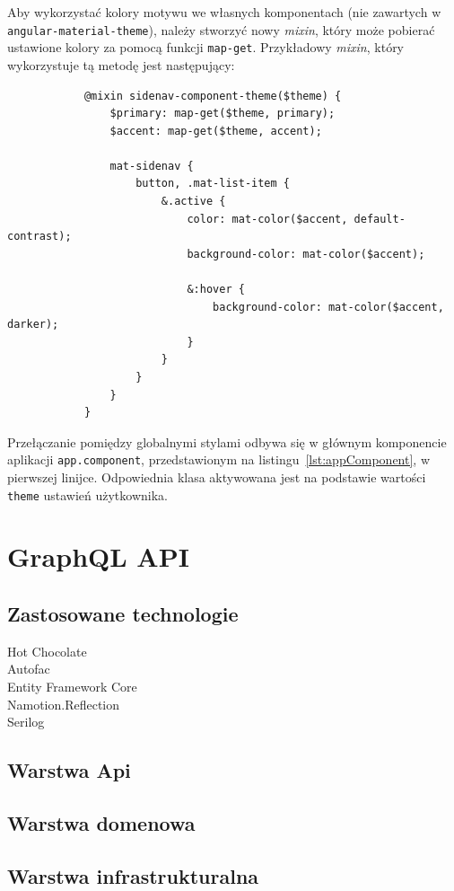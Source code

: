 		Aby wykorzystać kolory motywu we własnych komponentach (nie zawartych w \verb|angular-material-theme|),
		należy stworzyć nowy \emph{mixin}, który może pobierać ustawione kolory za pomocą funkcji \verb|map-get|.
		Przykładowy \emph{mixin}, który wykorzystuje tą metodę jest następujący:
		\begin{lstlisting}
			@mixin sidenav-component-theme($theme) {
				$primary: map-get($theme, primary);
				$accent: map-get($theme, accent);
			
				mat-sidenav {
					button, .mat-list-item {
						&.active {
							color: mat-color($accent, default-contrast);
							background-color: mat-color($accent);
			
							&:hover {
								background-color: mat-color($accent, darker);
							}
						}
					}
				}
			}			
		\end{lstlisting}

		Przełączanie pomiędzy globalnymi stylami odbywa się w głównym komponencie aplikacji \verb|app.component|,
		przedstawionym na listingu~\ref{lst:appComponent}, w pierwszej linijce.
		Odpowiednia klasa aktywowana jest na podstawie wartości \verb|theme| ustawień użytkownika.

\section{GraphQL API}
	\subsection{Zastosowane technologie}
		\begin{description}
			\item[Hot Chocolate] 
			\item[Autofac] 
			\item[Entity Framework Core] 
			\item[Namotion.Reflection] 
			\item[Serilog] 
		\end{description}

	\subsection{Warstwa Api}

	\subsection{Warstwa domenowa}

	\subsection{Warstwa infrastrukturalna}
	
